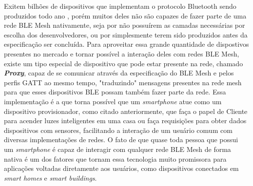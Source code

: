 \documentclass[../monografia.tex]{subfiles}
\begin{document}
Exitem bilhões de dispositivos que implementam o protocolo Bluetooth sendo produzidos todo ano \cite{ble-market-update}, porém muitos deles não são capazes de fazer parte de uma rede BLE Mesh nativamente, seja por não possuírem as camadas necessárias por escolha dos desenvolvedores, ou por simplesmente terem sido produzidos antes da especificação ser concluída. Para aproveitar essa grande quantidade de dispostivos presentes no mercado e tornar possível a interação deles com redes BLE Mesh, existe um tipo especial de dispositivo que pode estar presente na rede, chamado \textit{\textbf{Proxy}}, capaz de se comunicar através da especificação do BLE Mesh e pelos perfis GATT \cite{BLE-GATT} ao mesmo tempo, "traduzindo" mensagens presentes na rede mesh para que esses dispositivos BLE possam também fazer parte da rede. Essa implementação é a que torna possível que um \textit{smartphone} atue como um dispositivo provisionador, como citado anteriormente, que faça o papel de Cliente para acender luzes inteligentes em uma casa ou faça requisições para obter dados dispositivos com sensores, facilitando a interação de um usuário comum com diversas implementações de redes. O fato de que quase toda pessoa que possui um \textit{smartphone} é capaz de interagir com qualquer rede BLE Mesh de forma nativa é um dos fatores que tornam essa tecnologia muito promissora para aplicações voltadas diretamente aos usuários, como dispositivos conectados em \textit{smart homes} e \textit{smart buildings}.
\end{document}
